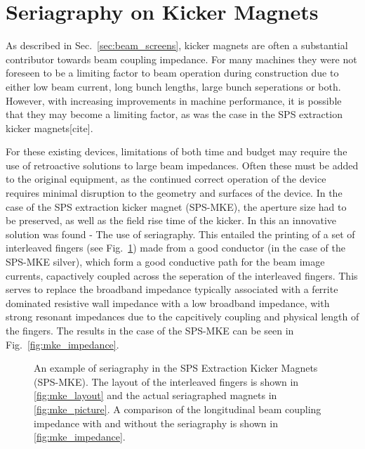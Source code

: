 \section{Seriagraphy on Kicker Magnets}
\label{sec:seriagraphy}

As described in Sec.~\ref{sec:beam_screens}, kicker magnets are often a substantial contributor towards beam coupling impedance. For many machines they were not foreseen to be a limiting factor to beam operation during construction due to either low beam current, long bunch lengths, large bunch seperations or both. However, with increasing improvements in machine performance, it is possible that they may become a limiting factor, as was the case in the SPS extraction kicker magnets[cite]. 

For these existing devices, limitations of both time and budget may require the use of retroactive solutions to large beam impedances. Often these must be added to the original equipment, as the continued correct operation of the device requires minimal disruption to the geometry and surfaces of the device. In the case of the SPS extraction kicker magnet (SPS-MKE), the aperture size had to be preserved, as well as the field rise time of the kicker. In this an innovative solution was found - The use of seriagraphy. This entailed the printing of a set of interleaved fingers (see Fig.~\ref{fig:mke_figures}) made from a good conductor (in the case of the SPS-MKE silver), which form a good conductive path for the beam image currents, capactively coupled across the seperation of the interleaved fingers. This serves to replace the broadband impedance typically associated with a ferrite dominated resistive wall impedance with a low broadband impedance, with strong resonant impedances due to the capcitively coupling and physical length of the fingers. The results in the case of the SPS-MKE can be seen in Fig.~\ref{fig:mke_impedance}.


\begin{figure}
\subfigure[]{

\label{fig:mke_layout}
}
\subfigure[]{

\label{fig:mke_picture}
}
\subfigure[]{

\label{fig:mke_impedance}
}

\caption{An example of seriagraphy in the SPS Extraction Kicker Magnets (SPS-MKE). The layout of the interleaved fingers is shown in \ref{fig:mke_layout} and the actual seriagraphed magnets in \ref{fig:mke_picture}. A comparison of the longitudinal beam coupling impedance with and without the seriagraphy is shown in \ref{fig:mke_impedance}.}
\label{fig:mke_figures}
\end{figure}

